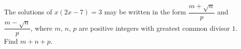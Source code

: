 The solutions of $x(2x-7)=3$ may be written in the form $\dfrac{m+\sqrt n}{p}$ and $\dfrac{m-\sqrt n}{p}$, where $m$, $n$, $p$ are positive integers with greatest common divisor $1$. Find $m+n+p$.
